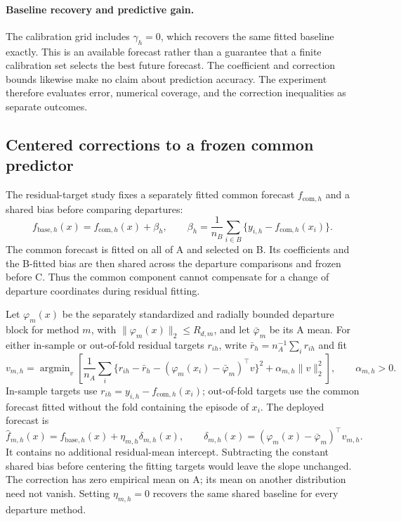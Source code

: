 \paragraph{Baseline recovery and predictive gain.}
The calibration grid includes $\gamma_h=0$, which recovers the same
fitted baseline exactly. This is an available forecast rather than a
guarantee that a finite calibration set selects the best future forecast.
The coefficient and correction bounds likewise make no claim about
prediction accuracy. The experiment therefore evaluates error, numerical
coverage, and the correction inequalities as separate outcomes.

\subsection{Centered corrections to a frozen common predictor}
\label{sec:fixed-common-decoder}

The residual-target study fixes a separately fitted common forecast
$f_{\mathrm{com},h}$ and a shared bias before comparing departures:
\begin{equation}
 f_{\mathrm{base},h}(x)=f_{\mathrm{com},h}(x)+\beta_h,\qquad
 \beta_h=\frac1{n_B}\sum_{i\in B}
       \{y_{i,h}-f_{\mathrm{com},h}(x_i)\}.
 \label{eq:mechanism-fixed-common-baseline}
\end{equation}
The common forecast is fitted on all of A and selected on B. Its
coefficients and the B-fitted bias are then shared across the departure
comparisons and frozen before C. Thus the common component cannot
compensate for a change of departure coordinates during residual fitting.

Let $\varphi_m(x)$ be the separately standardized and radially bounded
departure block for method $m$, with $\|\varphi_m(x)\|_2\leq R_{d,m}$,
and let $\bar\varphi_m$ be its A mean. For either in-sample or
out-of-fold residual targets $r_{ih}$, write
$\bar r_h=n_A^{-1}\sum_i r_{ih}$ and fit
\begin{equation}
 v_{m,h}=\mathop{\arg\min}_{v}\left[
 \frac1{n_A}\sum_i
 \{r_{ih}-\bar r_h-(\varphi_m(x_i)-\bar\varphi_m)^\top v\}^2
 +\alpha_{m,h}\|v\|_2^2\right],\qquad \alpha_{m,h}>0.
 \label{eq:mechanism-centered-slope-fit}
\end{equation}
In-sample targets use $r_{ih}=y_{i,h}-f_{\mathrm{com},h}(x_i)$;
out-of-fold targets use the common forecast fitted without the fold
containing the episode of $x_i$. The deployed forecast is
\begin{equation}
 \widehat f_{m,h}(x)=f_{\mathrm{base},h}(x)+\eta_{m,h}\delta_{m,h}(x),
 \qquad
 \delta_{m,h}(x)=(\varphi_m(x)-\bar\varphi_m)^\top v_{m,h}.
 \label{eq:mechanism-centered-slope-forecast}
\end{equation}
It contains no additional residual-mean intercept. Subtracting the
constant shared bias before centering the fitting targets would leave
the slope unchanged. The correction has zero empirical mean on A;
its mean on another distribution need not vanish. Setting $\eta_{m,h}=0$
recovers the same shared baseline for every departure method.

